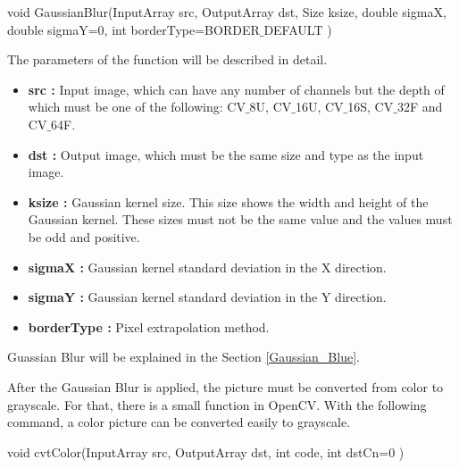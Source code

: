  \begin{center}
  
void GaussianBlur(InputArray src, OutputArray dst, Size ksize, double sigmaX, double sigmaY=0, int borderType=BORDER$\_$DEFAULT )

  \end{center}

The parameters of the function will be described in detail.\cite{GaussianBlur}
 
\begin{itemize}

\item \textbf{src : }Input image, which can have any number of channels but the depth of which must be one of the following: CV$\_$8U, CV$\_$16U, CV$\_$16S, CV$\_$32F and CV$\_$64F.
 
\item \textbf{dst : }Output image, which must be the same size and type as the input image.

\item \textbf{ksize : }Gaussian kernel size. This size shows the width and height of the Gaussian kernel. These sizes must not be the same value and the values must be odd and positive.

\item \textbf{sigmaX : }Gaussian kernel standard deviation in the X direction.

\item \textbf{sigmaY : }Gaussian kernel standard deviation in the Y direction.

\item \textbf{borderType : }Pixel extrapolation method.

\end{itemize}


Guassian Blur will be explained in the Section \ref{Gaussian_Blue}.










After the Gaussian Blur is applied, the picture must be converted from color to grayscale. For that, there is a small function in OpenCV. With the following command, a color picture can be converted easily to grayscale.

 \begin{center}
 
void cvtColor(InputArray src, OutputArray dst, int code, int dstCn=0 )

 \end{center}
 
